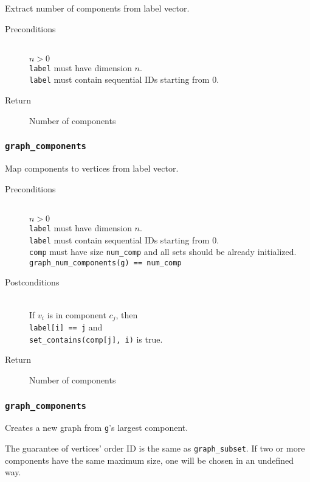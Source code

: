 \documentclass[a4paper,10pt]{article}
\begin{document}
Extract number of components from label vector.

\begin{description}
 \item[Preconditions] ~\\
   $n > 0$ \\
   \texttt{label} must have dimension $n$. \\
   \texttt{label} must contain sequential IDs starting from 0.
 \item[Return] Number of components
\end{description}

\subsubsection{\texttt{graph\_components}}

Map components to vertices from label vector.

\begin{description}
 \item[Preconditions] ~\\
   $n > 0$ \\
   \texttt{label} must have dimension $n$. \\
   \texttt{label} must contain sequential IDs starting from 0. \\
   \texttt{comp} must have size \texttt{num\_comp} and all sets should be already
   initialized. \\
   \texttt{graph\_num\_components(g) == num\_comp}
 \item[Postconditions] ~\\
   If $v_i$ is in component $c_j$, then \\
    \quad\texttt{label[i] == j} and \\
    \quad\texttt{set\_contains(comp[j], i)} is true.
 \item[Return] Number of components
\end{description}

\subsubsection{\texttt{graph\_components}}

Creates a new graph from \texttt{g}'s largest component.

The guarantee of vertices' order ID is the same as \texttt{graph\_subset}.
If two or more components have the same maximum size, one will be chosen in
an undefined way.
\end{document}
